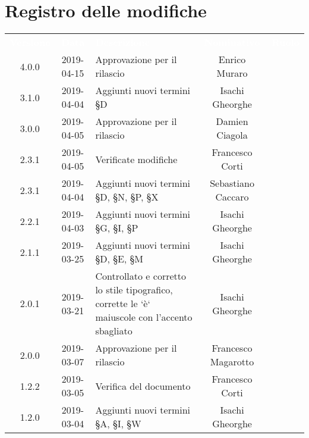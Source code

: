 
\section*{Registro delle modifiche}
{
	\renewcommand{\arraystretch}{1.5}
	\centering
	\begin{longtable}{ c c  C{4cm}  c  c }
		
		\textcolor{white}{\textbf{Versione}} & \textcolor{white}{\textbf{Data}} & \textcolor{white}{\textbf{Descrizione}} & \textcolor{white}{\textbf{Nominativo}} & \textcolor{white}{\textbf{Ruolo}}\\
		
		4.0.0 & 2019-04-15 & Approvazione per il rilascio & Enrico Muraro & \Res{}\\
		
		3.1.0 & 2019-04-04 & Aggiunti nuovi termini \S{D} & Isachi Gheorghe &\reda{}\\		
		
		3.0.0 & 2019-04-05 & Approvazione per il rilascio & Damien Ciagola &\Res{}\\

		2.3.1 & 2019-04-05 & Verificate modifiche & Francesco Corti &\ver{}\\

		2.3.1 & 2019-04-04 & Aggiunti nuovi termini \S{D}, \S{N}, \S{P}, \S{X} & Sebastiano Caccaro &\reda{}\\

		2.2.1 & 2019-04-03 & Aggiunti nuovi termini \S{G}, \S{I}, \S{P} & Isachi Gheorghe &\reda{}\\

		2.1.1 & 2019-03-25 & Aggiunti nuovi termini \S{D}, \S{E}, \S{M} & Isachi Gheorghe &\reda{}\\

		2.0.1 & 2019-03-21 & Controllato e corretto lo stile tipografico, corrette le `è` maiuscole con l'accento sbagliato &  Isachi Gheorghe & \reda{}\\			
		
		2.0.0 & 2019-03-07 & Approvazione per il rilascio &  Francesco Magarotto & \Res{}\\	

		1.2.2 & 2019-03-05 & Verifica del documento &  Francesco Corti & \ver{}\\		
		
		1.2.0 & 2019-03-04 & Aggiunti nuovi termini \S{A}, \S{I}, \S{W} & Isachi Gheorghe &\reda{}\\
		

\end{longtable}}
